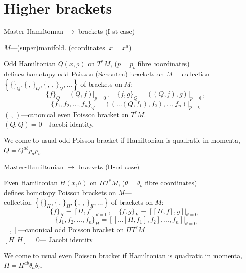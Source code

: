 \documentclass{beamer}
\begin{document}
\section{Higher brackets}
\begin{frame}{Master-Hamiltonian $\to$ brackets (I-st case)}

\centerline  {$M$---(super)manifold. (coordinates `$x=x^a$)}

\smallskip

Odd  Hamiltonian $Q(x,p)$ on $ T^*M$, ($p=p_b$ fibre coordinates) 
\\
defines homotopy odd Poisson (Schouten)  brackets on $M$---
   collection 
$\left\{\{\}_Q, \{\,,\,\}_Q, \{\,,\,,\,\}_Q,\dots\right\}$ 
of brackets on $M$:
                  $$
   \{f\}_Q=(Q,f)\big\vert_{p=0}\,,\quad
   \{f,g\}_Q=\left(\left(Q,f\right),g\right)\big\vert_{p=0}\,,
                 $$
                 $$
      \{f_1,f_2,\dots,f_n\}_Q=
\left(\left(\dots(Q,f_1),f_2\right),\dots,f_n\right)
        \big\vert_{p=0}
                 $$
$(\,,\,)$---canonical even Poisson
bracket on $T^*M$.\\
$(Q,Q)=0$---Jacobi identity, 
\medskip
  
We come to usual odd Poisson bracket if Hamiltonian is quadratic in
momenta, $Q=Q^{ab}p_ap_b$.


\end{frame}
\begin{frame}{Master-Hamiltonian $\to$ brackets (II-nd case)}


Even  Hamiltonian $H(x,\theta)$ on 
$\Pi T^*M$, ($\theta=\theta_b$ fibre coordinates) \\ 
defines  homotopy Poisson brackets on $M$---\\
  collection 
$\left\{\{\}_H, \{\,,\,\}_H, \{\,,\,,\,\}_H,\dots\right\}$ 
of brackets on $M$:
                 $$
   \{f\}_H=[H,f]\big\vert_{\theta=0}\,,\quad
   \{f,g\}_H=\left[\left[H,f\right],g\right]\big\vert_{\theta=0}\,,
                 $$
                 $$
      \{f_1,f_2,\dots,f_n\}_H=\left[\left[\dotsc\left[H,f_1\right],f_2\right],
\dotsc,f_n\right]\big\vert_{\theta=0}
                 $$
$[\,,\,]$---canonical odd Poisson
bracket on $\Pi T^*M$\\
$[H,H]=0$--- Jacobi identity              


We come to usual even Poisson bracket if Hamiltonian is quadratic in
momenta, $H=H^{ab}\theta_a\theta_b$.

    
           \end{frame}
\end{document}
